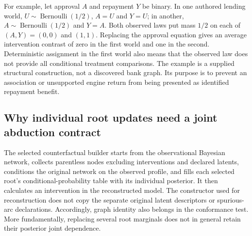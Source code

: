 For example, let approval $A$ and repayment $Y$ be binary. In one authored
lending world, $U\sim\operatorname{Bernoulli}(1/2)$, $A=U$ and $Y=U$;
in another, $A\sim\operatorname{Bernoulli}(1/2)$ and $Y=A$. Both observed laws
put mass $1/2$ on each of $(A,Y)=(0,0)$ and $(1,1)$. Replacing the approval
equation gives an average intervention contrast of zero in the first world
and one in the second. Deterministic assignment in the first world also means
that the observed law does not provide all conditional treatment comparisons.
The example is a supplied structural construction, not a discovered bank graph.
Its purpose is to prevent an association or unsupported engine return from
being presented as identified repayment benefit.
\citep{exec19_cxx_identification_reference}

\subsection{Why individual root updates need a joint abduction contract}
\label{exec19:cxxid-abduction}
The selected counterfactual builder starts from the observational Bayesian
network, collects parentless nodes excluding interventions and declared latents,
conditions the original network on the observed profile, and fills each selected
root's conditional-probability table with its individual posterior. It then
calculates an intervention in the reconstructed model. The constructor used
for reconstruction does not copy the separate original latent descriptors or
spurious-arc declarations. Accordingly, graph identity also belongs in the
conformance test. More fundamentally, replacing several root marginals does
not in general retain their posterior joint dependence.
\citep{exec19_cxx_identification_source}

